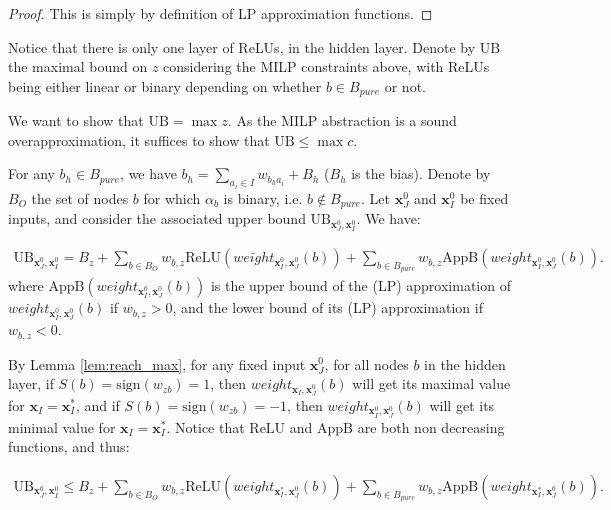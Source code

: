 \documentclass[]{article}
\theoremstyle{definition}
\newcommand{\ReLU}{\mathrm{ReLU}}
\begin{document}
\begin{proof}
	This is simply by definition of LP approximation functions.
\end{proof}

Notice that there is only one layer of ReLUs, in the hidden layer.
Denote by $\mathrm{UB}$ the maximal bound on $z$ considering the MILP constraints above, with ReLUs being either linear or binary depending on whether $b \in B_{pure}$ or not.

We want to show that $\mathrm{UB} = \max z$. As the MILP abstraction is a sound overapproximation, 
it suffices to show that $\mathrm{UB}\leq \max c$.

For any $b_h\in B_{pure}$, we have $b_h=\sum_{a_i\in I}w_{b_ha_i}+B_h$ ($B_h$ is the bias). 
Denote by $B_O$ the set of nodes $b$ for which $\alpha_b$ is binary, i.e. 
$b \notin B_{pure}$. %
Let $\boldsymbol{x}^0_J$ and $\boldsymbol{x}^0_I$ be fixed inputs, and consider the associated upper bound 
$\mathrm{UB}_{\boldsymbol{x}^0_J,\boldsymbol{x}^0_I}$. We have:

\begin{align*}
	\mathrm{UB}_{\boldsymbol{x}^0_J,\boldsymbol{x}^0_I} = B_z + \sum_{b\in B_O} w_{b,z}\ReLU(weight_{\boldsymbol{x}^0_I,\boldsymbol{x}^0_J}(b)) + \sum_{b\in B_{pure}} w_{b,z} \mathrm{AppB}(weight_{\boldsymbol{x}^0_I,\boldsymbol{x}^0_J}(b)).
\end{align*} where $\mathrm{AppB}(weight_{\boldsymbol{x}^0_I,\boldsymbol{x}^0_J}(b))$ is the upper bound of 
the (LP) approximation of $weight_{\boldsymbol{x}^0_I,\boldsymbol{x}^0_J}(b)$ if $w_{b,z}>0$, and the lower bound
of its (LP) approximation if $w_{b,z}<0$. 

By Lemma \ref{lem:reach_max}, for any fixed input $\boldsymbol{x}^0_J$, for all nodes $b$ in the hidden layer, if $S(b)=\mathrm{sign}(w_{zb})=1$, then 
$weight_{\boldsymbol{x}_I,\boldsymbol{x}^0_J}(b)$ will get its maximal value for $\boldsymbol{x}_I=\boldsymbol{x}_I^*$,
and if $S(b)=\mathrm{sign}(w_{zb})=-1$, then $weight_{\boldsymbol{x}^0_I,\boldsymbol{x}^0_J}(b)$ will get its minimal value for $\boldsymbol{x}_I=\boldsymbol{x}_I^*$.
Notice that $\mathrm{ReLU}$ and $\mathrm{AppB}$ are both non decreasing functions, and thus:

\begin{align*}
	\mathrm{UB}_{\boldsymbol{x}^0_J,\boldsymbol{x}^0_I} \leq B_z + \sum_{b\in B_O} w_{b,z}\ReLU(weight_{\boldsymbol{x}^*_I,\boldsymbol{x}^0_J}(b)) +
	\sum_{b\in B_{pure}} w_{b,z} \mathrm{AppB}(weight_{\boldsymbol{x}^*_I,\boldsymbol{x}^0_J}(b)).
\end{align*} 
\end{document}
